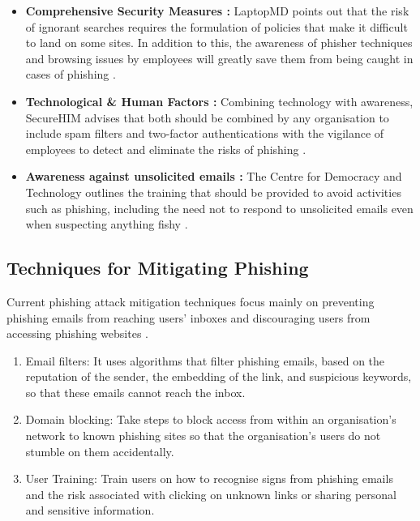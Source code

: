 \begin{itemize}
    
     \item \textbf{Comprehensive Security Measures :} LaptopMD points out that the risk of ignorant searches requires the formulation of policies that make it difficult to land on some sites. In addition to this, the awareness of phisher techniques and browsing issues by employees will greatly save them from being caught in cases of phishing \cite{DigitalGuardianPhishingPrevention}.
     
     \item \textbf{Technological \& Human Factors :} Combining technology with awareness, SecureHIM advises that both should be combined by any organisation to include spam filters and two-factor authentications with the vigilance of employees to detect and eliminate the risks of phishing \cite{DigitalGuardianPhishingPrevention}.
     
     \item \textbf{Awareness against unsolicited emails :} The Centre for Democracy and Technology outlines the training that should be provided to avoid activities such as phishing, including the need not to respond to unsolicited emails even when suspecting anything fishy \cite{CDTPhishingMitigation}.
     
     
\end{itemize}

\subsection{Techniques for Mitigating Phishing}

Current phishing attack mitigation techniques focus mainly on preventing phishing
emails from reaching users' inboxes and discouraging users from accessing
phishing websites \cite{Suzuki2021Phishing}.

\begin{enumerate}
    \item Email filters: It uses algorithms that filter phishing emails, based on the reputation of the sender, the embedding of the link, and suspicious keywords, so that these emails cannot reach the inbox.
    \item Domain blocking: Take steps to block access from within an organisation's network to known phishing sites so that the organisation's users do not stumble on them accidentally.
    \item User Training: Train users on how to recognise signs from phishing emails and the risk associated with clicking on unknown links or sharing personal and sensitive information.
\end{enumerate}


